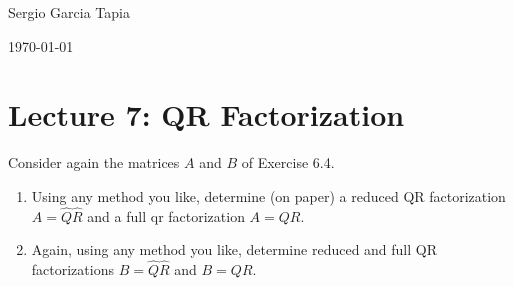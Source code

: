 \documentclass[12pt]{article}
\newenvironment{ex}[2][Exercise]{\begin{trivlist}
		\item[\hskip \labelsep {\bfseries #1}\hskip \labelsep {\bfseries #2.}]}{\end{trivlist}}
\begin{document}

\noindent Sergio Garcia Tapia \hfill

 \hfill 

 \hfill 

\noindent\today
\section*{Lecture 7: QR Factorization}

\begin{ex}{1}
	Consider again the matrices $A$ and $B$ of Exercise 6.4.
	\begin{enumerate}[label=(\alph*)]
		\item Using any method you like, determine (on paper) a reduced QR factorization $A=\hat{Q}\hat{R}$
		and a full qr factorization $A=QR$.
		\item Again, using any method you like, determine reduced and full QR factorizations $B=\hat{Q}\hat{R}$
		and $B=QR$.
	\end{enumerate}
\end{ex}
\end{document}
